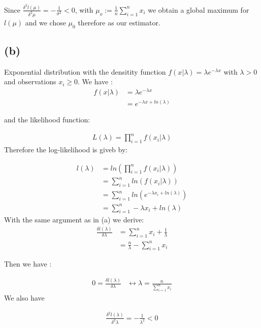 \documentclass{article}
\begin{document}
Since $\frac{\delta^2 l(\mu)}{\delta^2 \mu} = -\frac{1}{\sigma^2}< 0$, with $\mu_o := \frac{1}{n} \sum_{i=1}^n x_i$ we obtain a global maximum for $l(\mu)$ and we chose $\mu_0$ therefore as our estimator.

\subsection*{(b)}

Exponential distribution with the densitity function $f(x|\lambda)= \lambda e^{-\lambda x}$ with $\lambda > 0$ and observations $x_i \geq 0$.
We have :
\begin{align*}
    f(x|\lambda) &= \lambda e^{-\lambda x}\\
                &= e^{-\lambda x +ln(\lambda)}
\end{align*}

and the likelihood function:

\begin{align*}
    L(\lambda)= \prod_{i=1}^n f(x_i | \lambda)
\end{align*}
Therefore the log-likelihood is giveb by:

\begin{align*}
    l(\lambda)  &= ln(\prod_{i=1}^n f(x_i | \lambda)) \\
                &= \sum_{i=1}^n ln(f(x_i| \lambda))\\
                &= \sum_{i=1}^n ln( e^{-\lambda x_i +ln(\lambda)})\\
                &= \sum_{i=1}^n -\lambda x_i +ln(\lambda)
\end{align*}
With the same argument as in (a) we derive:
\begin{align*}
\frac{\delta l(\lambda)}{\delta \lambda}     &= \sum_{i=1}^n x_i + \frac{1}{\lambda} \\
                                            &= \frac{n}{\lambda} - \sum_{i=1}^n x_i
\end{align*}

Then we have :

\begin{align*}
    0  = \frac{\delta l(\lambda)}{\delta \lambda}    & \leftrightarrow \lambda = \frac{n}{\sum_{i=1}^n x_i}
\end{align*}
We also have 

\begin{align*}
    \frac{\delta^2 l(\lambda)}{\delta^2 \lambda} = -\frac{1}{\lambda^2}<0
\end{align*}
\end{document}
